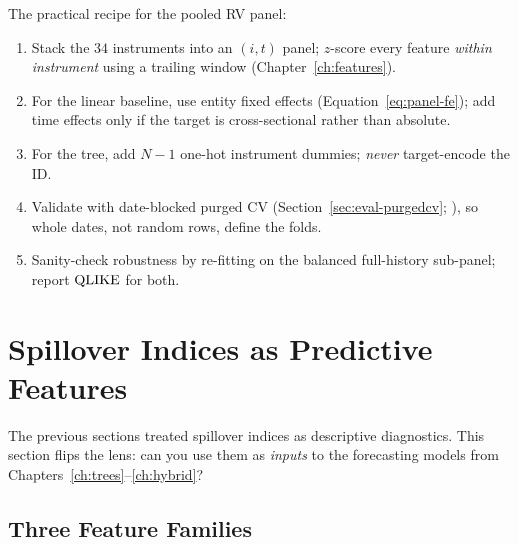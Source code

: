The practical recipe for the pooled RV panel:
\begin{enumerate}[nosep]
  \item Stack the $34$ instruments into an $(i,t)$ panel; $z$-score every feature
        \emph{within instrument} using a trailing window
        (Chapter~\ref{ch:features}).
  \item For the linear baseline, use entity fixed effects
        (Equation~\eqref{eq:panel-fe}); add time effects only if the target is
        cross-sectional rather than absolute.
  \item For the tree, add $N-1$ one-hot instrument dummies; \emph{never}
        target-encode the ID.
  \item Validate with date-blocked purged CV (Section~\ref{sec:eval-purgedcv};
        ), so whole dates, not random
        rows, define the folds.
  \item Sanity-check robustness by re-fitting on the balanced full-history
        sub-panel; report $\operatorname{QLIKE}$ for both.
\end{enumerate}


\section{Spillover Indices as Predictive Features}\label{sec:spillover-features}

The previous sections treated spillover indices as descriptive diagnostics.
This section flips the lens: can you use them as \emph{inputs} to the forecasting
models from Chapters~\ref{ch:trees}--\ref{ch:hybrid}?

\subsection{Three Feature Families}

